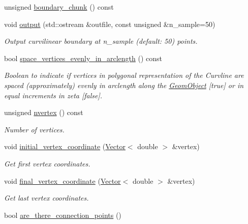 \begin{DoxyCompactItemize}
unsigned \hyperlink{classoomph_1_1TriangleMeshCurviLine_a42b8ef1fb0ad0078413d0fedc87af679}{boundary\+\_\+chunk} () const
\item 
void \hyperlink{classoomph_1_1TriangleMeshCurviLine_a4432e3848032cc78bc3282149c4d6cff}{output} (std\+::ostream \&outfile, const unsigned \&n\+\_\+sample=50)
\begin{DoxyCompactList}\small\item\em Output curvilinear boundary at n\+\_\+sample (default\+: 50) points. \end{DoxyCompactList}\item 
bool \hyperlink{classoomph_1_1TriangleMeshCurviLine_aeebdc2c7b0bfe0e577ba1b6c93b38895}{space\+\_\+vertices\+\_\+evenly\+\_\+in\+\_\+arclength} () const
\begin{DoxyCompactList}\small\item\em Boolean to indicate if vertices in polygonal representation of the Curvline are spaced (approximately) evenly in arclength along the \hyperlink{classoomph_1_1GeomObject}{Geom\+Object} \mbox{[}true\mbox{]} or in equal increments in zeta \mbox{[}false\mbox{]}. \end{DoxyCompactList}\item 
unsigned \hyperlink{classoomph_1_1TriangleMeshCurviLine_a4a60d6fadfae8165ed9fde9987ef4f0d}{nvertex} () const
\begin{DoxyCompactList}\small\item\em Number of vertices. \end{DoxyCompactList}\item 
void \hyperlink{classoomph_1_1TriangleMeshCurviLine_a164a96e8cce279bce6cb3f01f5bf6170}{initial\+\_\+vertex\+\_\+coordinate} (\hyperlink{classoomph_1_1Vector}{Vector}$<$ double $>$ \&vertex)
\begin{DoxyCompactList}\small\item\em Get first vertex coordinates. \end{DoxyCompactList}\item 
void \hyperlink{classoomph_1_1TriangleMeshCurviLine_a6a2437a4fb8c17ccc02a82311d477ca0}{final\+\_\+vertex\+\_\+coordinate} (\hyperlink{classoomph_1_1Vector}{Vector}$<$ double $>$ \&vertex)
\begin{DoxyCompactList}\small\item\em Get last vertex coordinates. \end{DoxyCompactList}\item 
bool \hyperlink{classoomph_1_1TriangleMeshCurviLine_a040f5978d5efa810b0b96fd17b9c0108}{are\+\_\+there\+\_\+connection\+\_\+points} ()

\end{DoxyCompactItemize}

